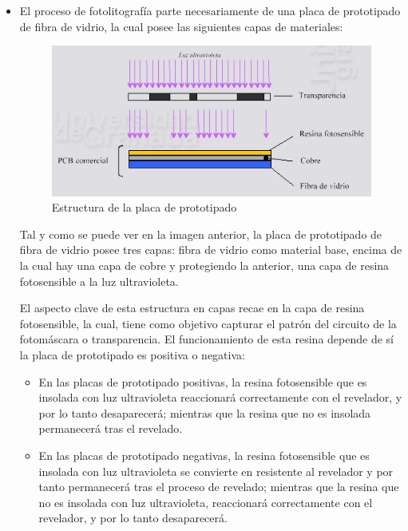 \begin{itemize}
    \item El proceso de fotolitografía parte necesariamente de una placa de prototipado de fibra de vidrio, la cual posee las siguientes capas de materiales:
    
    \begin{figure}[H]
    \centering 
    \includegraphics[width=0.9\linewidth]{pictures/Proceso1.JPG}
    \caption{Estructura de la placa de prototipado}
    \label{fig:kdiagram}
    \end{figure}
    
    Tal y como se puede ver en la imagen anterior, la placa de prototipado de fibra de vidrio posee tres capas: fibra de vidrio como material base, encima de la cual hay una capa de cobre y protegiendo la anterior, una capa de resina fotosensible a la luz ultravioleta.
    
    El aspecto clave de esta estructura en capas recae en la capa de resina fotosensible, la cual, tiene como objetivo capturar el patrón del circuito de la fotomáscara o transparencia. El funcionamiento de esta resina depende de sí la placa de prototipado es positiva o negativa:
    \begin{itemize}
        \item En las placas de prototipado positivas, la resina fotosensible que es insolada con luz ultravioleta reaccionará correctamente con el revelador, y por lo tanto desaparecerá; mientras que la resina que no es insolada permanecerá tras el revelado.
        
        \item En las placas de prototipado negativas, la resina fotosensible que es insolada con luz ultravioleta se convierte en resistente al revelador y por tanto permanecerá tras el proceso de revelado; mientras que la resina que no es insolada con luz ultravioleta, reaccionará correctamente con el revelador, y por lo tanto desaparecerá.
    \end{itemize}
    

\end{itemize}
